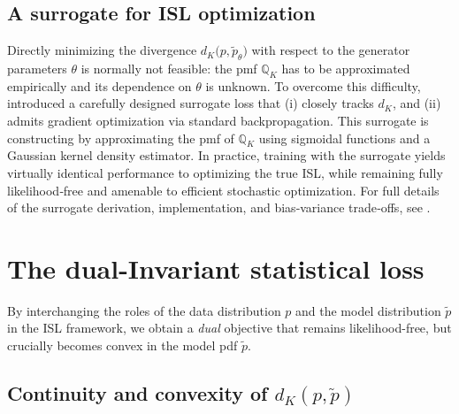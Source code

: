 \documentclass{article}
\begin{document}
\subsection{A surrogate for ISL optimization}


Directly minimizing the divergence $d_K\bigl(p,\tilde p_\theta\bigr)$ with respect to the generator parameters $\theta$ is normally not feasible: the pmf $\mathbb{Q}_{K}$ has to be approximated empirically and its dependence on $\theta$ is unknown. To overcome this difficulty, \cite{de2024training} introduced a carefully designed surrogate loss that (i) closely tracks $d_K$, and (ii) admits gradient optimization via standard backpropagation. This surrogate is constructing by approximating the pmf of $\mathbb{Q}_{K}$ using  sigmoidal functions and a Gaussian kernel density estimator. In practice, training with the surrogate yields virtually identical performance to optimizing the true ISL, while remaining fully likelihood‐free and amenable to efficient stochastic optimization. For full details of the surrogate derivation, implementation, and bias‐variance trade‐offs, see \cite[Section 2.3]{de2024robust}.


\section{The dual-Invariant statistical loss} \label{section: new theoretical results about discrepancy measure}

By interchanging the roles of the data distribution \(p\) and the model distribution \(\tilde p\) in the ISL framework, we obtain a \emph{dual} objective that remains likelihood-free, but crucially becomes convex in the model pdf $\tilde{p}$.  

\subsection{Continuity and convexity of $d_{K}(p,\tilde{p})$}
\end{document}
